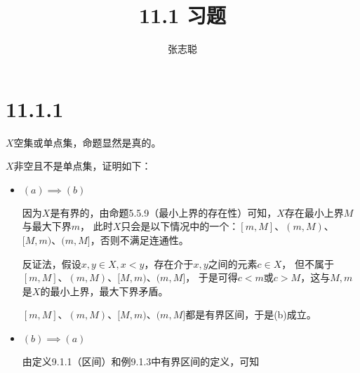 \documentclass{article}
\begin{document}
\title{11.1 习题}
\author{张志聪}
\maketitle

\section*{11.1.1}

$X$空集或单点集，命题显然是真的。

$X$非空且不是单点集，证明如下：
\begin{itemize}
  \item $(a) \implies (b)$

        因为$X$是有界的，由命题5.5.9（最小上界的存在性）可知，$X$存在最小上界$M$与最大下界$m$，
        此时$X$只会是以下情况中的一个：$[m, M]$、$(m, M)$、$[M, m)$、$(m, M]$，否则不满足连通性。

        反证法，假设$x,y \in X, x < y$，存在介于$x,y$之间的元素$c \in X$，
        但不属于$[m, M]$、$(m, M)$、$[M, m)$、$(m, M]$，
        于是可得$c < m$或$c > M$，这与$M,m$是$X$的最小上界，最大下界矛盾。

        $[m, M]$、$(m, M)$、$[M, m)$、$(m, M]$都是有界区间，于是(b)成立。


  \item $(b) \implies (a)$

  由定义9.1.1（区间）和例9.1.3中有界区间的定义，可知


\end{itemize}
\end{document}

